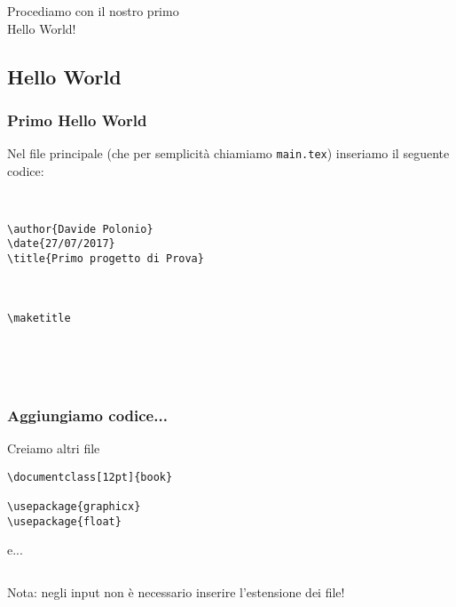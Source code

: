 \begin{frame}

\begin{center}
  \huge Procediamo con il nostro primo \\
  \huge Hello World! 
\end{center}

\end{frame}

\subsection{Hello World}
\begin{frame}[fragile]

\frametitle{Primo Hello World}
 
 Nel file principale (che per semplicità chiamiamo \texttt{main.tex}) inseriamo 
il seguente codice:

\begin{lstlisting}[frame = single, title={File main.tex}] 


\author{Davide Polonio}
\date{27/07/2017}
\title{Primo progetto di Prova}



\maketitle



 
\end{lstlisting}

\end{frame}

\begin{frame}[fragile]
 
 \frametitle{Aggiungiamo codice...}
 
 Creiamo altri file
 
 \begin{lstlisting}[frame = single, title={File res/config/package.tex}]
\documentclass[12pt]{book}

\usepackage{graphicx}
\usepackage{float}
 \end{lstlisting}

 e...
 
 \begin{lstlisting}[frame = single, title={File res/listOfSections.tex}]

 \end{lstlisting}

Nota: negli input non è necessario inserire l'estensione dei file! 
\end{frame}

